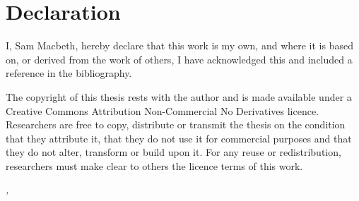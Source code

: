 \chapter*{Declaration}
\thispagestyle{empty}

I, Sam Macbeth, hereby declare that this work is my own, and where it is based
on, or derived from the work of others, I have acknowledged this and included
a reference in the bibliography.

The copyright of this thesis rests with the author and is made available under a
Creative Commons
Attribution Non-Commercial No Derivatives licence. Researchers are free to copy, distribute or
transmit the thesis on the condition that they attribute it, that they do not use it for commercial
purposes and that they do not alter, transform or build upon it. For any reuse or redistribution,
researchers must make clear to others the licence terms of this work.
\bigskip
 
\noindent\textit{\myLocation, \myTime}

\smallskip

